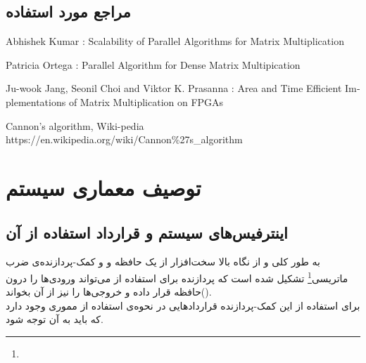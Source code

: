 \documentclass[12pt,onecolumn,a4paper,fleqn]{article}
\begin{document}
 \pagebreak

\subsection{مراجع مورد استفاده}

\begin{latin}
\begin{thebibliography}{}
	
	Abhishek Kumar : Scalability of Parallel Algorithms for Matrix Multiplication
	
	Patricia Ortega : Parallel Algorithm for Dense Matrix Multipication
	
	Ju-wook Jang, Seonil Choi and Viktor K. Prasanna : Area and Time Efficient Implementations of Matrix Multiplication on FPGAs
	
	Cannon's algorithm, Wiki-pedia\\ https://en.wikipedia.org/wiki/Cannon\%27s\_algorithm
	
	
\end{thebibliography}
\end{latin}

\pagebreak

\section{توصیف معماری سیستم}
\subsection{اینترفیس‌های سیستم و قرارداد استفاده از آن }
به طور کلی  و از نگاه بالا سخت‌افزار از یک حافظه و و کمک-پردازنده‌ی ضرب ماتریسی\footnote{} تشکیل شده است که پردازنده برای استفاده از‌ می‌تواند ورودی‌ها را درون حافظه قرار داده و خروجی‌ها را نیز از آن بخواند(). 
\\ برای استفاده از این  کمک-پردازنده قرارداد‌هایی در نحوه‌ی استفاده از مموری وجود دارد که باید به آن توجه شود.
\end{document}
